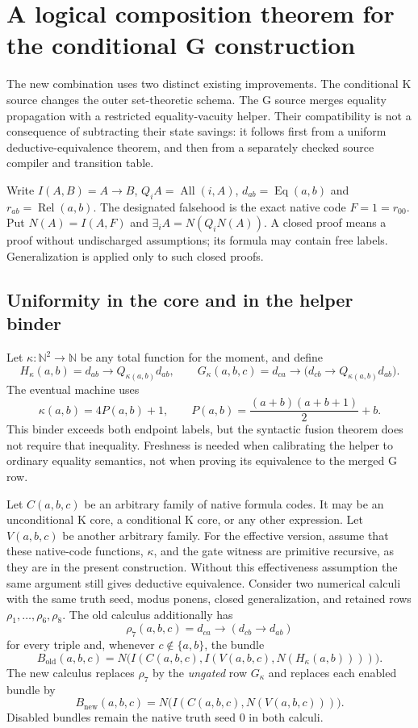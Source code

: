 \section{A logical composition theorem for the conditional G construction}
\label{sec:conditional-g}

The new combination uses two distinct existing improvements. The conditional
K source changes the outer set-theoretic schema. The G source merges equality
propagation with a restricted equality-vacuity helper. Their compatibility is
not a consequence of subtracting their state savings: it follows first from a
uniform deductive-equivalence theorem, and then from a separately checked
source compiler and transition table.

Write $I(A,B)=A\mathbin{\to}B$, $Q_iA=\operatorname{All}(i,A)$,
$d_{ab}=\operatorname{Eq}(a,b)$ and $r_{ab}=\operatorname{Rel}(a,b)$.
The designated falsehood is the exact native code $F=1=r_{00}$.
Put $N(A)=I(A,F)$ and $\exists_iA=N(Q_iN(A))$. A closed proof means a
proof without undischarged assumptions; its formula may contain free labels.
Generalization is applied only to such closed proofs.

\subsection{Uniformity in the core and in the helper binder}

Let $\kappa\colon\mathbb N^2\to\mathbb N$ be any total function for the
moment, and define
\[
 H_\kappa(a,b)=d_{ab}\to Q_{\kappa(a,b)}d_{ab},\qquad
 G_\kappa(a,b,c)=d_{ca}\to
       \bigl(d_{cb}\to Q_{\kappa(a,b)}d_{ab}\bigr).
\]
The eventual machine uses
\[
 \kappa(a,b)=4P(a,b)+1,\qquad
 P(a,b)=\frac{(a+b)(a+b+1)}2+b.
\]
This binder exceeds both endpoint labels, but the syntactic fusion theorem
does not require that inequality. Freshness is needed when calibrating the
helper to ordinary equality semantics, not when proving its equivalence to
the merged G row.

Let $C(a,b,c)$ be an arbitrary family of native formula codes. It may be an
unconditional K core, a conditional K core, or any other expression. Let
$V(a,b,c)$ be another arbitrary family. For the effective version, assume
that these native-code functions, $\kappa$, and the gate witness are primitive
recursive, as they are in the present construction. Without this effectiveness
assumption the same argument still gives deductive equivalence.
Consider two numerical calculi with
the same truth seed, modus ponens, closed generalization, and retained rows
$\rho_1,\ldots,\rho_6,\rho_8$. The old calculus additionally has
\[
 \rho_7(a,b,c)=d_{ca}\to(d_{cb}\to d_{ab})
\]
for every triple and, whenever $c\notin\{a,b\}$, the bundle
\[
 B_{\mathrm{old}}(a,b,c)
   =N\bigl(I(C(a,b,c),I(V(a,b,c),N(H_\kappa(a,b))))\bigr).
\]
The new calculus replaces $\rho_7$ by the \emph{ungated} row $G_\kappa$
and replaces each enabled bundle by
\[
 B_{\mathrm{new}}(a,b,c)
   =N\bigl(I(C(a,b,c),N(V(a,b,c)))\bigr).
\]
Disabled bundles remain the native truth seed $0$ in both calculi.

